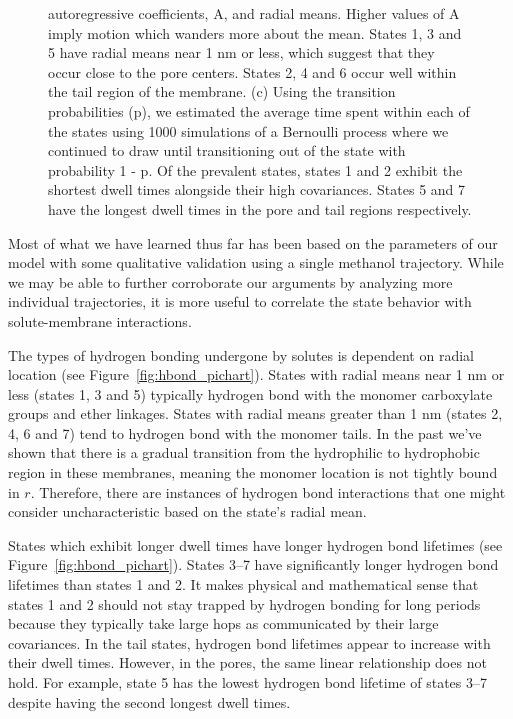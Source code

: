\documentclass{article}
\begin{document}
\begin{figure}
{  autoregressive coefficients, A, and radial means. Higher values of A imply motion which wanders 
  more about the mean. States 1, 3 and 5 have radial means near 1 nm or less, which suggest that they
  occur close to the pore centers. States 2, 4 and 6 occur well within the tail region of the membrane.
  (c) Using the transition probabilities (p), we estimated the average time spent within each 
  of the states using 1000 simulations of a Bernoulli process where we continued to draw until transitioning
  out of the state with probability 1 - p. Of the prevalent states, states 1 and 
  2 exhibit the shortest dwell times alongside their high covariances. States 5 and 7 have the longest dwell times in the pore and tail regions respectively.
  }\label{fig:common_states_MET}
  \end{figure}
  
  Most of what we have learned thus far has been based on the parameters of our
  model with some qualitative validation using a single methanol trajectory. While 
  we may be able to further corroborate our arguments by analyzing more
  individual trajectories, it is more useful to correlate the state behavior with
  solute-membrane interactions.

  The types of hydrogen bonding undergone by solutes is dependent on radial
  location (see Figure~\ref{fig:hbond_pichart}). States with radial means near 1 nm
  or less (states 1, 3 and 5) typically hydrogen bond with the monomer carboxylate
  groups and ether linkages. States with radial means greater than 1 nm (states 2,
  4, 6 and 7) tend to hydrogen bond with the monomer tails. In the past we've shown
  that there is a gradual transition from the hydrophilic to hydrophobic region in
  these membranes, meaning the monomer location is not tightly bound in $r$. Therefore,
  there are instances of hydrogen bond interactions that one might consider 
  uncharacteristic based on the state's radial mean.
  
  States which exhibit longer dwell times have longer hydrogen bond lifetimes (see
  Figure~\ref{fig:hbond_pichart}). States 3--7 have significantly longer hydrogen 
  bond lifetimes than states 1 and 2. It makes physical and mathematical sense that
  states 1 and 2 should not stay trapped by hydrogen bonding for long periods because
  they typically take large hops as communicated by their large covariances.
  In the tail states, hydrogen bond lifetimes appear to increase with their dwell 
  times. However, in the pores, the same linear relationship does not hold.
  For example, state 5 has the lowest hydrogen bond lifetime of states 3--7
  despite having the second longest dwell times. 
  
\end{document}
